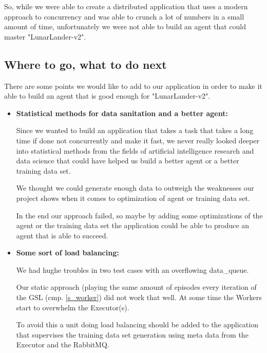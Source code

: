 So, while we were able to create a distributed application
that uses a modern approach to concurrency and was able to
crunch a lot of numbers in a small amount of time,
unfortunately we were not able to build an agent that
could master "LunarLander-v2".

\subsection{Where to go, what to do next}

There are some points we would like to add to our
application in order to make it able to build an agent
that is good enough for "LunarLander-v2".

\begin{itemize}[label={}]

  \item \textbf{Statistical methods for data sanitation and
                a better agent:}

        Since we wanted to build an application that
        takes a task that takes a long time if done
        not concurrently and make it fast, we never really
        looked deeper into statistical methods from the
        fields of artificial intelligence research and
        data science that could have helped us build a
        better agent or a better training data set.

        We thought we could generate enough data to
        outweigh the weaknesses our project shows when it
        comes to optimization of agent or training data
        set.

        In the end our approach failed, so maybe by adding
        some optimizations of the agent or the training
        data set the application could be able to produce
        an agent that is able to succeed.

  \item \textbf{Some sort of load balancing:}

        We had hughe troubles in two test cases with
        an overflowing data\_queue.

        Our static approach (playing the same amount of
        episodes every iteration of the GSL (cmp.
        \ref{s_worker}) did not work that well. At some
        time the Workers start to overwhelm the
        Executor(s).

        To avoid this a unit doing load balancing should be
        added to the application that supervises the
        training data set generation using meta data from
        the Executor and the RabbitMQ.


\end{itemize}
